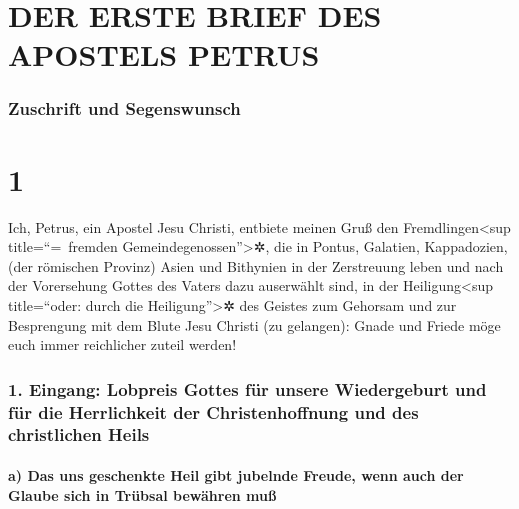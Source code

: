 \hypertarget{der-erste-brief-des-apostels-petrus}{%
\section{DER ERSTE BRIEF DES APOSTELS
PETRUS}\label{der-erste-brief-des-apostels-petrus}}

\hypertarget{zuschrift-und-segenswunsch}{%
\subsubsection{Zuschrift und
Segenswunsch}\label{zuschrift-und-segenswunsch}}

\hypertarget{section}{%
\section{1}\label{section}}

 Ich, Petrus, ein Apostel Jesu Christi, entbiete meinen
Gruß den Fremdlingen\textless sup title=``=~fremden
Gemeindegenossen''\textgreater✲, die in Pontus, Galatien, Kappadozien,
(der römischen Provinz) Asien und Bithynien in der Zerstreuung leben
 und nach der Vorersehung Gottes des Vaters dazu
auserwählt sind, in der Heiligung\textless sup title=``oder: durch die
Heiligung''\textgreater✲ des Geistes zum Gehorsam und zur Besprengung
mit dem Blute Jesu Christi (zu gelangen): Gnade und Friede möge euch
immer reichlicher zuteil werden!

\hypertarget{eingang-lobpreis-gottes-fuxfcr-unsere-wiedergeburt-und-fuxfcr-die-herrlichkeit-der-christenhoffnung-und-des-christlichen-heils}{%
\subsubsection{1. Eingang: Lobpreis Gottes für unsere Wiedergeburt und
für die Herrlichkeit der Christenhoffnung und des christlichen
Heils}\label{eingang-lobpreis-gottes-fuxfcr-unsere-wiedergeburt-und-fuxfcr-die-herrlichkeit-der-christenhoffnung-und-des-christlichen-heils}}

\hypertarget{a-das-uns-geschenkte-heil-gibt-jubelnde-freude-wenn-auch-der-glaube-sich-in-truxfcbsal-bewuxe4hren-muuxdf}{%
\paragraph{a) Das uns geschenkte Heil gibt jubelnde Freude, wenn auch
der Glaube sich in Trübsal bewähren
muß}\label{a-das-uns-geschenkte-heil-gibt-jubelnde-freude-wenn-auch-der-glaube-sich-in-truxfcbsal-bewuxe4hren-muuxdf}}

